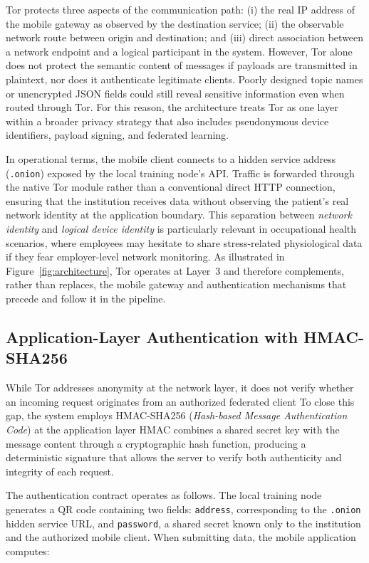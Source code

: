 \documentclass[12pt]{article}
\begin{document}
Tor protects three aspects of the communication path: (i) the real IP address of the mobile gateway as observed by the destination service; (ii) the observable network route between origin and destination; and (iii) direct association between a network endpoint and a logical participant in the system. However, Tor alone does not protect the semantic content of messages if payloads are transmitted in plaintext, nor does it authenticate legitimate clients. Poorly designed topic names or unencrypted JSON fields could still reveal sensitive information even when routed through Tor. For this reason, the architecture treats Tor as one layer within a broader privacy strategy that also includes pseudonymous device identifiers, payload signing, and federated learning.

In operational terms, the mobile client connects to a hidden service address (\texttt{.onion}) exposed by the local training node's API. Traffic is forwarded through the native Tor module rather than a conventional direct HTTP connection, ensuring that the institution receives data without observing the patient's real network identity at the application boundary. This separation between \textit{network identity} and \textit{logical device identity} is particularly relevant in occupational health scenarios, where employees may hesitate to share stress-related physiological data if they fear employer-level network monitoring. As illustrated in Figure~\ref{fig:architecture}, Tor operates at Layer~3 and therefore complements, rather than replaces, the mobile gateway and authentication mechanisms that precede and follow it in the pipeline.

\subsection{Application-Layer Authentication with HMAC-SHA256}

While Tor addresses anonymity at the network layer, it does not verify whether an incoming request originates from an authorized federated client To close this gap, the system employs HMAC-SHA256 (\textit{Hash-based Message Authentication Code}) at the application layer HMAC combines a shared secret key with the message content through a cryptographic hash function, producing a deterministic signature that allows the server to verify both authenticity and integrity of each request.

The authentication contract operates as follows. The local training node generates a QR code containing two fields: \texttt{address}, corresponding to the \texttt{.onion} hidden service URL, and \texttt{password}, a shared secret known only to the institution and the authorized mobile client. When submitting data, the mobile application computes:
\end{document}
